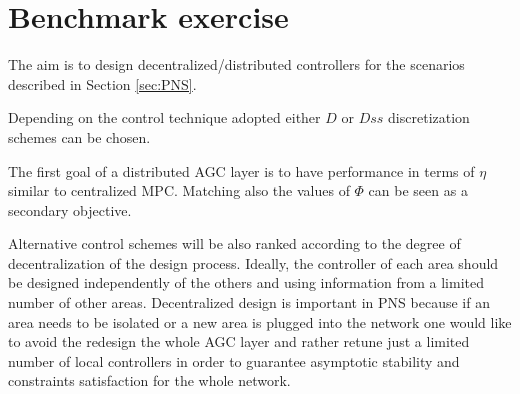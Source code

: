 \documentclass[a4paper]{article}
\begin{document}
     
     \section{Benchmark exercise}
          The aim is to design decentralized/distributed controllers for the scenarios described in Section \ref{sec:PNS}.

          Depending on the control technique adopted either $D$ or $Dss$ discretization schemes can be chosen. 

          The first goal of a distributed AGC layer is to have performance in terms of $\eta$ similar to centralized MPC. Matching also the values of $\Phi$ can be seen as a secondary objective.

          Alternative control schemes will be also ranked according to the degree of decentralization of the design process. Ideally, the controller of each area should be designed independently of the others and using information from a limited number of other areas. Decentralized design is important in PNS because if an area needs to be isolated or a new area is plugged into the network one would like to avoid the redesign the whole AGC layer and rather retune just a limited number of local controllers in order to guarantee asymptotic stability and constraints satisfaction for the whole network.


     
     
\end{document}
